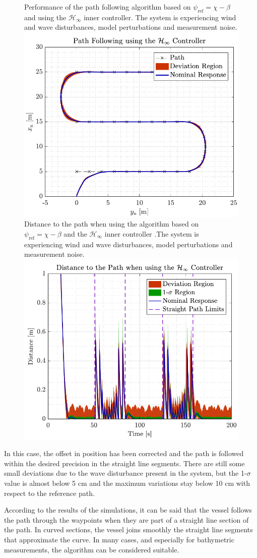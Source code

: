 \begin{figure}[H]
	\captionbox 
	{   
		Performance of the path following algorithm based on $\psi_\mathrm{ref}=\chi-\beta$ and using the $\mathcal{H}_\infty$ inner controller. The system is experiencing wind and wave disturbances, model perturbations and measurement noise. \label{fig:robustcorrect}
	}                                                                 
	{                                                                  
		\includegraphics[width=.45\textwidth]{figures/path_rob}         
	}                                                                    
	\hspace{5pt}                                                          
	\captionbox  
	{      
			Distance to the path when using the algorithm based on $\psi_\mathrm{ref}=\chi-\beta$ and the $\mathcal{H}_\infty$ inner controller .The system is experiencing wind and wave disturbances, model perturbations and measurement noise.\label{fig:distrobustcorrect}
	}                                                                          
	{
		\includegraphics[width=.45\textwidth]{figures/dist_rob}
	}
\end{figure}

In this case, the offset in position has been corrected and the path is followed within the desired precision in the straight line segments. There are still some small deviations due to the wave disturbance present in the system, but the 1-$\sigma$ value is almost below 5 cm and the maximum variations stay below 10 cm with respect to the reference path.

According to the results of the simulations, it can be said that the vessel follows the path through the waypoints when they are part of a straight line section of the path. In curved sections, the vessel joins smoothly the straight line segments that approximate the curve. In many cases, and especially for bathymetric measurements, the algorithm can be considered suitable.